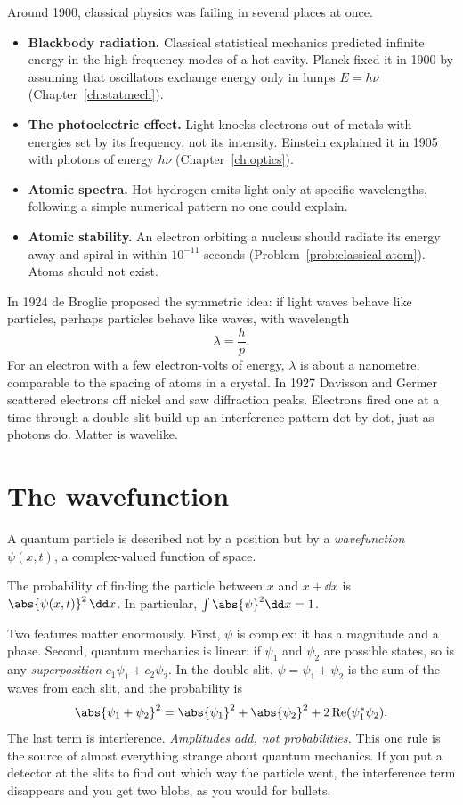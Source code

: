 Around 1900, classical physics was failing in several places at once.
\begin{itemize}[itemsep=3pt]
  \item \textbf{Blackbody radiation.} Classical statistical mechanics predicted infinite energy in the high-frequency modes of a hot cavity. Planck fixed it in 1900 by assuming that oscillators exchange energy only in lumps $E = h\nu$ (Chapter~\ref{ch:statmech}).
  \item \textbf{The photoelectric effect.} Light knocks electrons out of metals with energies set by its frequency, not its intensity. Einstein explained it in 1905 with photons of energy $h\nu$ (Chapter~\ref{ch:optics}).
  \item \textbf{Atomic spectra.} Hot hydrogen emits light only at specific wavelengths, following a simple numerical pattern no one could explain.
  \item \textbf{Atomic stability.} An electron orbiting a nucleus should radiate its energy away and spiral in within $10^{-11}$ seconds (Problem~\ref{prob:classical-atom}). Atoms should not exist.
\end{itemize}
In 1924 de Broglie proposed the symmetric idea: if light waves behave like particles, perhaps particles behave like waves, with wavelength
\[
  \lambda = \frac{h}{p}.
\]
For an electron with a few electron-volts of energy, $\lambda$ is about a nanometre, comparable to the spacing of atoms in a crystal. In 1927 Davisson and Germer scattered electrons off nickel and saw diffraction peaks. Electrons fired one at a time through a double slit build up an interference pattern dot by dot, just as photons do. Matter is wavelike.

\section{The wavefunction}

A quantum particle is described not by a position but by a \emph{wavefunction} $\psi(x,t)$, a complex-valued function of space.

\begin{law}
The probability of finding the particle between $x$ and $x+\dd x$ is $\abs{\psi(x,t)}^2\,\dd x$. In particular, $\int\abs{\psi}^2\dd x = 1$.
\end{law}

Two features matter enormously. First, $\psi$ is complex: it has a magnitude and a phase. Second, quantum mechanics is linear: if $\psi_1$ and $\psi_2$ are possible states, so is any \emph{superposition} $c_1\psi_1 + c_2\psi_2$. In the double slit, $\psi = \psi_1+\psi_2$ is the sum of the waves from each slit, and the probability is
\[
  \abs{\psi_1 + \psi_2}^2 = \abs{\psi_1}^2 + \abs{\psi_2}^2 + 2\,\mathrm{Re}(\psi_1^*\psi_2).
\]
The last term is interference. \emph{Amplitudes add, not probabilities.} This one rule is the source of almost everything strange about quantum mechanics. If you put a detector at the slits to find out which way the particle went, the interference term disappears and you get two blobs, as you would for bullets.

